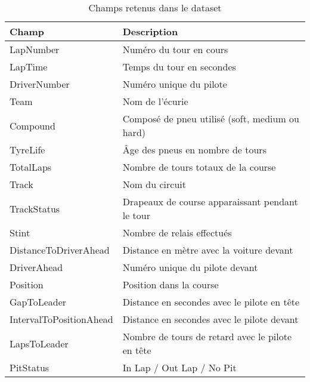\begin{table}[H]
    \begin{center}
        \caption{\label{dataset_features}Champs retenus dans le dataset}
        \begin{tabular}{ll}
            Champ                   & Description                                      \\ \hline
            LapNumber               & Numéro du tour en cours                          \\
            LapTime                 & Temps du tour en secondes                        \\
            DriverNumber            & Numéro unique du pilote                          \\
            Team                    & Nom de l'écurie                                  \\
            Compound                & Composé de pneu utilisé (soft, medium ou hard)   \\
            TyreLife                & Âge des pneus en nombre de tours                 \\
            TotalLaps               & Nombre de tours totaux de la course              \\
            Track                   & Nom du circuit                                   \\
            TrackStatus             & Drapeaux de course apparaissant pendant le tour  \\
            Stint                   & Nombre de relais effectués                       \\
            DistanceToDriverAhead   & Distance en mètre avec la voiture devant         \\
            DriverAhead             & Numéro unique du pilote devant                   \\
            Position                & Position dans la course                          \\
            GapToLeader             & Distance en secondes avec le pilote en tête      \\
            IntervalToPositionAhead & Distance en secondes avec le pilote devant       \\
            LapsToLeader            & Nombre de tours de retard avec le pilote en tête \\
            PitStatus               & In Lap / Out Lap / No Pit                        \\
        \end{tabular}
    \end{center}
\end{table}

